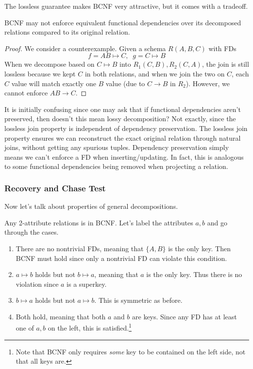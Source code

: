 \documentclass{article}
\begin{document}
    The lossless guarantee makes BCNF very attractive, but it comes with a tradeoff. 

    \begin{theorem}
      BCNF may not enforce equivalent functional dependencies over its decomposed relations compared to its original relation. 
    \end{theorem}
    \begin{proof}
      We consider a counterexample. Given a schema $R(A, B, C)$ with FDs 
      \begin{equation}
        f = AB \mapsto C, \;\; g = C \mapsto B
      \end{equation} 
      When we decompose based on $C \mapsto B$ into $R_1 (C, B), R_2(C, A)$, the join is still lossless because we kept $C$ in both relations, and when we join the two on $C$, each $C$ value will match exactly one $B$ value (due to $C \rightarrow B$ in $R_2$). However, we cannot enforce $AB \rightarrow C$. 
    \end{proof}

    It is initially confusing since one may ask that if functional dependencies aren't preserved, then doesn't this mean lossy decomposition? Not exactly, since the lossless join property is independent of dependency preservation. The lossless join property ensures we can reconstruct the exact original relation through natural joins, without getting any spurious tuples. Dependency preservation simply means we can't enforce a FD when inserting/updating. In fact, this is analogous to some functional dependencies being removed when projecting a relation. 

  \subsubsection{Recovery and Chase Test} 

    Now let's talk about properties of general decompositions. 

    \begin{theorem}
      Any 2-attribute relations is in BCNF. Let's label the attributes $a, b$ and go through the cases. 
      \begin{enumerate}
        \item There are no nontrivial FDs, meaning that $\{A, B\}$ is the only key. Then BCNF must hold since only a nontrivial FD can violate this condition. 
        \item $a \mapsto b$ holds but not $b \mapsto a$, meaning that $a$ is the only key. Thus there is no violation since $a$ is a superkey. 
        \item $b \mapsto a$ holds but not $a \mapsto b$. This is symmetric as before. 
        \item Both hold, meaning that both $a$ and $b$ are keys. Since any FD has at least one of $a, b$ on the left, this is satisfied.\footnote{Note that BCNF only requires \textit{some} key to be contained on the left side, not that all keys are. } 
      \end{enumerate}
    \end{theorem}
\end{document}
